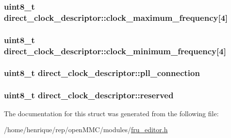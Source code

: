 \hypertarget{structdirect__clock__descriptor_a43b971729733124d70a643df38d945b1}{
\subsubsection[{clock\-\_\-maximum\-\_\-frequency}]{\setlength{\rightskip}{0pt plus 5cm}uint8\-\_\-t direct\-\_\-clock\-\_\-descriptor\-::clock\-\_\-maximum\-\_\-frequency\mbox{[}4\mbox{]}}}\label{structdirect__clock__descriptor_a43b971729733124d70a643df38d945b1}
\hypertarget{structdirect__clock__descriptor_adf3b49034069ce2cf7d808831b993e71}{
\subsubsection[{clock\-\_\-minimum\-\_\-frequency}]{\setlength{\rightskip}{0pt plus 5cm}uint8\-\_\-t direct\-\_\-clock\-\_\-descriptor\-::clock\-\_\-minimum\-\_\-frequency\mbox{[}4\mbox{]}}}\label{structdirect__clock__descriptor_adf3b49034069ce2cf7d808831b993e71}
\hypertarget{structdirect__clock__descriptor_af0863a4a7168074bd3c006d9e93f9af2}{
\subsubsection[{pll\-\_\-connection}]{\setlength{\rightskip}{0pt plus 5cm}uint8\-\_\-t direct\-\_\-clock\-\_\-descriptor\-::pll\-\_\-connection}}\label{structdirect__clock__descriptor_af0863a4a7168074bd3c006d9e93f9af2}
\hypertarget{structdirect__clock__descriptor_a6d98c4131e3d9686da36c075e002c20d}{
\subsubsection[{reserved}]{\setlength{\rightskip}{0pt plus 5cm}uint8\-\_\-t direct\-\_\-clock\-\_\-descriptor\-::reserved}}\label{structdirect__clock__descriptor_a6d98c4131e3d9686da36c075e002c20d}


The documentation for this struct was generated from the following file\-:\begin{DoxyCompactItemize}
\item 
/home/henrique/rep/open\-M\-M\-C/modules/\hyperlink{fru__editor_8h}{fru\-\_\-editor.\-h}\end{DoxyCompactItemize}
